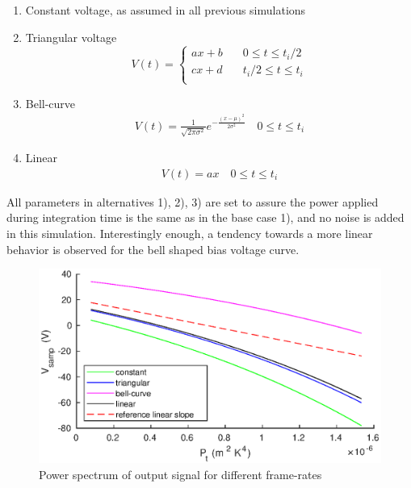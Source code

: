 \begin{enumerate}
\item Constant voltage, as assumed in all previous simulations
\item Triangular voltage
\[   
V(t) = 
     \begin{cases}
       ax+b &\quad 0 \leq t \leq t_{i}/2\\
       cx+d &\quad t_{i}/2 \le t \leq t_{i}\\
     \end{cases}
\]
\item Bell-curve
\begin{align*}
V(t) = \frac{1}{\sqrt{2\pi \sigma^2}} e^{-\frac{(x-\mu)^{2}}{2\sigma^{2}}} \quad 0 \leq t \leq t_{i}
\end{align*}
\item Linear
\begin{align*}
V(t) = ax \quad 0 \leq t \leq t_{i}
\end{align*}
\end{enumerate}

All parameters in alternatives 1), 2), 3) are set to assure the power applied during integration time is the same as in the base case 1), and no noise is added in this simulation. Interestingly enough, a tendency towards a more linear behavior is observed for the bell shaped bias voltage curve.

\begin{figure}[H]
 \begin{center}
\includegraphics[scale=0.9]{gfx/out_vs_inrad.eps} 	  
  \caption{Power spectrum of output signal for different frame-rates}
  \label{fig:out_vs_inrad}
  \end{center}
\end{figure}

